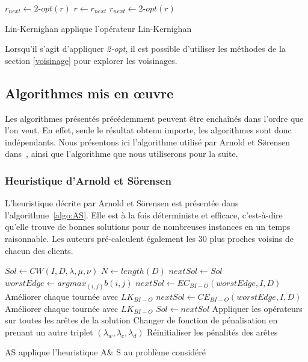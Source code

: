 \documentclass[a4paper,11pt]{article}%
\begin{document}
\begin{algorithm}
\DontPrintSemicolon %
$r_{next} \gets 2$-$opt(r) $\;
 {
  $r \gets r_{next}$\;
  $r_{next} \gets 2$-$opt(r)$\;
}
\;
\caption{{\sc Lin-Kernighan} applique l'opérateur Lin-Kernighan}
\label{algo:LK}
\end{algorithm}

Lorsqu'il s'agit d'appliquer \emph{2-opt}, il est possible d'utiliser les méthodes de la section \ref{voisinage} pour explorer les voisinages.

\subsection{Algorithmes mis en œuvre}
Les algorithmes présentés précédemment peuvent être enchaînés dans l'ordre que l'on veut. 
En effet, seule le résultat obtenu importe, les algorithmes sont donc indépendants. 
Nous présentons ici l'algorithme utilisé par Arnold et S\"\o rensen dans~\cite{Sorensen_2017}, ainsi que l'algorithme que nous utiliserons pour la suite.

\subsubsection{Heuristique d'Arnold et Sörensen}

L'heuristique décrite par Arnold et Sörensen est présentée dans l'algorithme~\ref{algo:AS}. Elle est à la fois déterministe et efficace, c'est-à-dire qu'elle trouve de bonnes solutions pour de nombreuses instances en un temps raisonnable. Les auteurs pré-calculent également les $30$ plus proches voisins de chacun des clients.


\begin{algorithm}
\DontPrintSemicolon %
$Sol \gets CW(I,D,\lambda,\mu,\nu)$\;
$N \gets length(D)$\;
$nextSol \gets Sol$\;
 {
	$worstEdge \gets argmax_{(i,j)} b(i,j) $\;
	$nextSol \gets EC_{BI-O}(worstEdge,I,D)$\;
	Améliorer chaque tournée avec $LK_{BI-O}$\;
	$nextSol \gets CE_{BI-O}(worstEdge,I,D)$\;
	Améliorer chaque tournée avec $LK_{BI-O}$\;
	 {
		$ Sol \gets nextSol$\;
	}
	 {
		Appliquer les opérateurs sur toutes les arêtes de la solution\;
	}
	 {
		Changer de fonction de pénalisation en prenant un autre triplet $(\lambda_w,\lambda_c,\lambda_d)$\;
	}
	 {
		Réinitialiser les pénalités des arêtes\;
	}
}
\;
\caption{{\sc AS} applique l'heuristique A\& S au problème considéré}
\label{algo:AS}
\end{algorithm}
\end{document}
